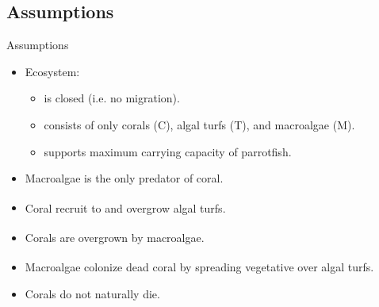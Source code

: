 \documentclass{beamer}
\begin{document}
\subsection{Assumptions}
\begin{frame}{Assumptions}
    \begin{itemize}
        \item Ecosystem:
        \begin{itemize}
            \item is closed (i.e. no migration).
            \item consists of only corals (C), algal turfs (T), and macroalgae (M).
            \item supports maximum carrying capacity of parrotfish.
        \end{itemize}
        \item Macroalgae is the only predator of coral.
        \item Coral recruit to and overgrow algal turfs\textsuperscript{\cite{04_mathanalysis}}.
        \item Corals are overgrown by macroalgae\textsuperscript{\cite{04_mathanalysis}}.
        \item Macroalgae colonize dead coral by spreading vegetative over algal turfs\textsuperscript{\cite{04_mathanalysis}}.
        \item Corals do not naturally die.
    \end{itemize}
\end{frame}
\end{document}
